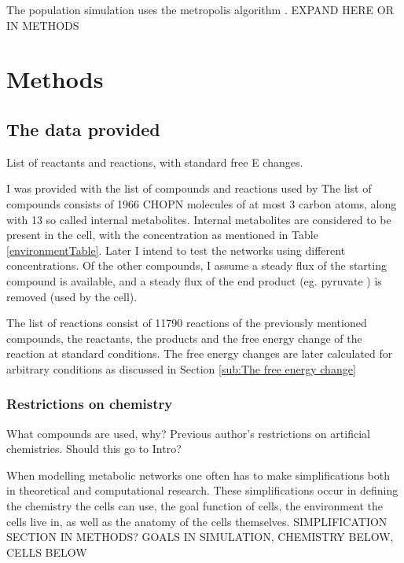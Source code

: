 \documentclass[10pt,a4paper]{article}
\begin{document}
	The population simulation uses the metropolis algorithm \cite{metropolisalgorithm}. EXPAND HERE OR IN METHODS


	
\section{Methods}
\label{sec:methods}

\subsection{The data provided}
\label{sub:What was I provided with?}
List of reactants and reactions, with standard free E changes. 



	
	I was provided with the list of compounds and reactions used by \citeauthor{BartekLower} The list of compounds consists of 1966 CHOPN molecules of at most 3 carbon atoms, along with 13 so called internal metabolites. Internal metabolites are considered to be present in the cell, with the concentration as mentioned in Table \ref{environmentTable}. Later I intend to test the networks using different concentrations. Of the other compounds, I assume a steady flux of the starting compound is available, and a steady flux of the end product (eg. pyruvate ) is removed (used by the cell). 
	
	The list of reactions consist of 11790 reactions of the previously mentioned compounds, the reactants, the products and the free energy change of the reaction at standard conditions. The free energy changes are later calculated for arbitrary conditions as discussed in Section \ref{sub:The free energy change}
	
\subsubsection{Restrictions on chemistry}
\label{ssub:Restrictions on chemistry}
What compounds are used, why?
Previous author's restrictions on artificial chemistries. Should this go to Intro?



	When modelling metabolic networks one often has to make simplifications both in theoretical and computational research. These simplifications occur in defining the chemistry the cells can use, the goal function of cells, the environment the cells live in, as well as the anatomy of the cells themselves. SIMPLIFICATION SECTION IN METHODS? GOALS IN SIMULATION, CHEMISTRY BELOW, CELLS BELOW
	
\end{document}
